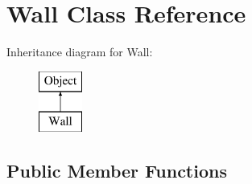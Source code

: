 \hypertarget{class_wall}{}\section{Wall Class Reference}
\label{class_wall}
Inheritance diagram for Wall\+:\begin{figure}[H]
\begin{center}
\leavevmode
\includegraphics[height=2.000000cm]{class_wall}
\end{center}
\end{figure}
\subsection*{Public Member Functions}
